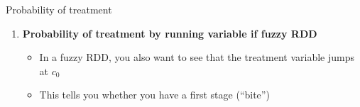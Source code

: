 \documentclass{beamer}
\begin{document}
\begin{frame}{Probability of treatment}
	
	\begin{enumerate}\addtocounter{enumi}{1}
	\item \textbf{Probability of treatment by running variable if fuzzy RDD}
		\begin{itemize}
		\item In a fuzzy RDD, you also want to see that the treatment variable jumps at $c_0$ 
		\item This tells you whether you have a first stage (``bite'')
		\end{itemize}
	\end{enumerate}
\end{frame}

\begin{frame}[plain]

			\begin{figure}
			\end{figure}

\end{frame}
\end{document}
